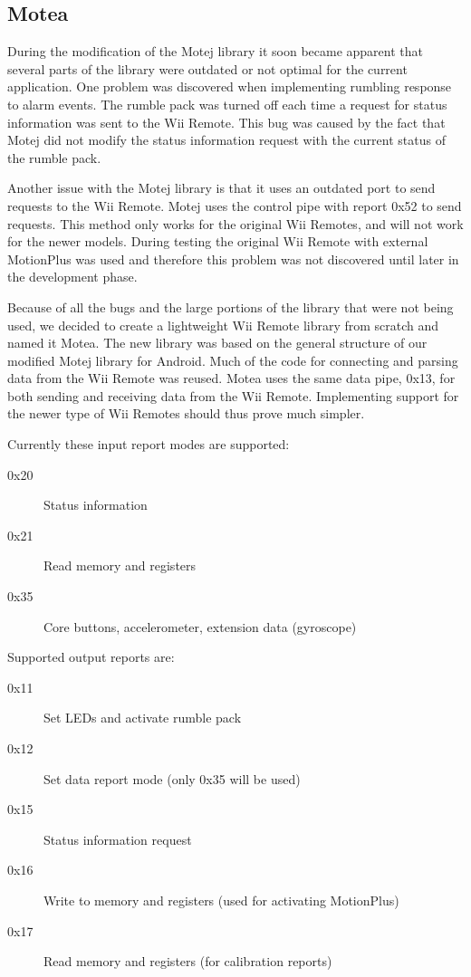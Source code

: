 \subsection{Motea}
\label{sec:motea}
During the modification of the Motej library it soon became apparent that several parts of the library were outdated or not optimal for the current application. One problem was discovered when implementing rumbling response to alarm events. The rumble pack was turned off each time a request for status information was sent to the Wii Remote. This bug was caused by the fact that Motej did not modify the status information request with the current status of the rumble pack.

Another issue with the Motej library is that it uses an outdated port to send requests to the Wii Remote. Motej uses the control pipe with report 0x52 to send requests. This method only works for the original Wii Remotes, and will not work for the newer models. During testing the original Wii Remote with external MotionPlus was used and therefore this problem was not discovered until later in the development phase.

Because of all the bugs and the large portions of the library that were not being used, we decided to create a lightweight Wii Remote library from scratch and named it Motea. The new library was based on the general structure of our modified Motej library for Android. Much of the code for connecting and parsing data from the Wii Remote was reused. Motea uses the same data pipe, 0x13, for both sending and receiving data from the Wii Remote. Implementing support for the newer type of Wii Remotes should thus prove much simpler.

Currently these input report modes are supported:
\begin{description}
	\item[0x20] Status information
	\item[0x21] Read memory and registers
	\item[0x35] Core buttons, accelerometer, extension data (gyroscope)
\end{description}

Supported output reports are:
\begin{description}
	\item[0x11] Set LEDs and activate rumble pack
	\item[0x12] Set data report mode (only 0x35 will be used)
	\item[0x15] Status information request
	\item[0x16] Write to memory and registers (used for activating MotionPlus)
	\item[0x17] Read memory and registers (for calibration reports)
\end{description}

